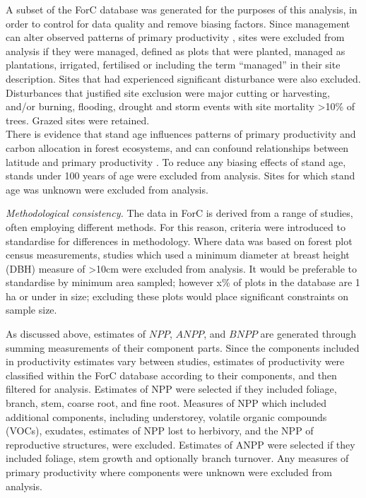 \documentclass[]{article}
\begin{document}
A subset of the ForC database was generated for the purposes of this
analysis, in order to control for data quality and remove biasing
factors. Since management can alter observed patterns of primary
productivity \citep{simova_enigma_2017}, sites were excluded from
analysis if they were managed, defined as plots that were planted,
managed as plantations, irrigated, fertilised or including the term
``managed'' in their site description. Sites that had experienced
significant disturbance were also excluded. Disturbances that justified
site exclusion were major cutting or harvesting, and/or burning,
flooding, drought and storm events with site mortality
\textgreater{}10\% of trees. Grazed sites were retained.\\
There is evidence that stand age influences patterns of primary
productivity and carbon allocation in forest ecosystems, and can
confound relationships between latitude and primary productivity
\citep{de_lucia_forest_2007, gillman_latitude_2015}. To reduce any
biasing effects of stand age, stands under 100 years of age were
excluded from analysis. Sites for which stand age was unknown were
excluded from analysis.

\emph{Methodological consistency.} The data in ForC is derived from a
range of studies, often employing different methods. For this reason,
criteria were introduced to standardise for differences in methodology.
Where data was based on forest plot census measurements, studies which
used a minimum diameter at breast height (DBH) measure of
\textgreater{}10cm were excluded from analysis. It would be preferable
to standardise by minimum area sampled; however x\% of plots in the
database are 1 ha or under in size; excluding these plots would place
significant constraints on sample size.

As discussed above, estimates of \(NPP\), \(ANPP\), and \(BNPP\) are
generated through summing measurements of their component parts. Since
the components included in productivity estimates vary between studies,
estimates of productivity were classified within the ForC database
according to their components, and then filtered for analysis. Estimates
of NPP were selected if they included foliage, branch, stem, coarse
root, and fine root. Measures of NPP which included additional
components, including understorey, volatile organic compounds (VOCs),
exudates, estimates of NPP lost to herbivory, and the NPP of
reproductive structures, were excluded. Estimates of ANPP were selected
if they included foliage, stem growth and optionally branch turnover.
Any measures of primary productivity where components were unknown were
excluded from analysis.
\end{document}
